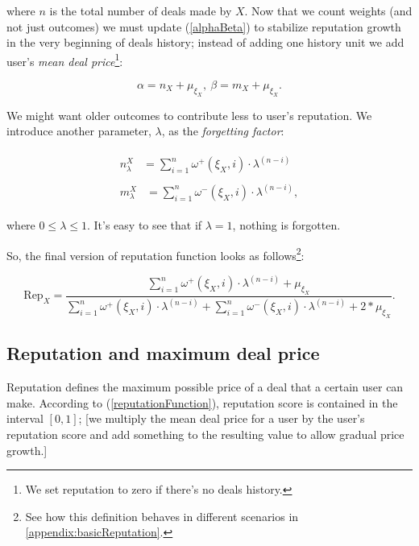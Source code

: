 \documentclass[11pt]{article}
\begin{document}
where $ n $ is the total number of deals made by $ X $. Now that we count weights (and not just outcomes) we must update (\ref{alphaBeta}) to stabilize reputation growth in the very beginning of deals history; instead of adding one history unit we add user's \textit{mean deal price}\footnote{We set reputation to zero if there's no deals history.}:

\begin{equation} \label{alphaBeta}
\alpha = n_{X} + \mu_{\xi_X},\ \beta = m_{X} + \mu_{\xi_X}.
\end{equation}

We might want older outcomes to contribute less to user's reputation. We introduce another parameter, $ \lambda $, as the \textit{forgetting factor}:

\begin{align}
\begin{split}
n_{\lambda}^{X} {}& = \sum_{i = 1}^{n} \omega^{+}(\xi_X, i) \cdot \lambda^{(n - i)}
\end{split} \\
\begin{split}
m_{\lambda}^{X} {}& = \sum_{i = 1}^{n} \omega^{-}(\xi_X, i) \cdot \lambda^{(n - i)},
\end{split}
\end{align}

where $ 0 \leq \lambda \leq 1 $. It's easy to see that if $ \lambda = 1 $, nothing is forgotten.

So, the final version of reputation function looks as follows\footnote{See how this definition behaves in different scenarios in \ref{appendix:basicReputation}.}:

\begin{equation} \label{reputationFunction}
\text{Rep}_{X} = \frac{\sum_{i = 1}^{n} \omega^{+}(\xi_X, i) \cdot \lambda^{(n - i)} + \mu_{\xi_X}}{\sum_{i = 1}^{n} \omega^{+}(\xi_X, i) \cdot \lambda^{(n - i)} + \sum_{i = 1}^{n} \omega^{-}(\xi_X, i) \cdot \lambda^{(n - i)} + 2 * \mu_{\xi_X}}.
\end{equation}

\bigskip

\subsection{Reputation and maximum deal price} \label{reputation:maxDealprice}

Reputation defines the maximum possible price of a deal that a certain user can make. According to (\ref{reputationFunction}), reputation score is contained in the interval $ [0, 1] $; [we multiply the mean deal price for a user by the user's reputation score and add something to the resulting value to allow gradual price growth.]
\end{document}
